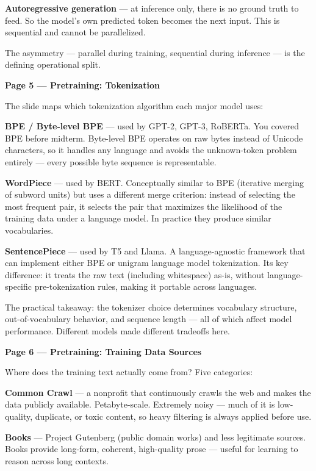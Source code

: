 \textbf{Autoregressive generation} --- at inference only, there is no ground truth to feed. So the model's own predicted token becomes the next input. This is sequential and cannot be parallelized.

The asymmetry --- parallel during training, sequential during inference --- is the defining operational split.

\medskip

\textbf{Page 5 --- Pretraining: Tokenization}

The slide maps which tokenization algorithm each major model uses:

\textbf{BPE / Byte-level BPE} --- used by GPT-2, GPT-3, RoBERTa. You covered BPE before midterm. Byte-level BPE operates on raw bytes instead of Unicode characters, so it handles any language and avoids the unknown-token problem entirely --- every possible byte sequence is representable.

\textbf{WordPiece} --- used by BERT. Conceptually similar to BPE (iterative merging of subword units) but uses a different merge criterion: instead of selecting the most frequent pair, it selects the pair that maximizes the likelihood of the training data under a language model. In practice they produce similar vocabularies.

\textbf{SentencePiece} --- used by T5 and Llama. A language-agnostic framework that can implement either BPE or unigram language model tokenization. Its key difference: it treats the raw text (including whitespace) as-is, without language-specific pre-tokenization rules, making it portable across languages.

The practical takeaway: the tokenizer choice determines vocabulary structure, out-of-vocabulary behavior, and sequence length --- all of which affect model performance. Different models made different tradeoffs here.

\medskip

\textbf{Page 6 --- Pretraining: Training Data Sources}

Where does the training text actually come from? Five categories:

\textbf{Common Crawl} --- a nonprofit that continuously crawls the web and makes the data publicly available. Petabyte-scale. Extremely noisy --- much of it is low-quality, duplicate, or toxic content, so heavy filtering is always applied before use.

\textbf{Books} --- Project Gutenberg (public domain works) and less legitimate sources. Books provide long-form, coherent, high-quality prose --- useful for learning to reason across long contexts.

